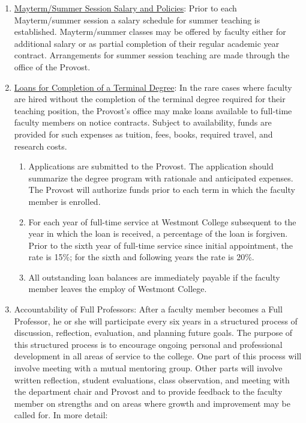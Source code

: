 \begin{enumerate}[label=\alph*)]
				\item{\underline{ Mayterm/Summer Session Salary and Policies}:  Prior to each Mayterm/summer
					session a salary schedule for summer teaching is established.  Mayterm/summer
					classes may be offered by faculty either for additional salary or as partial
					completion of their regular academic year contract. Arrangements for summer
					session teaching are made through the office of the Provost. }

				\item{\underline{ Loans for Completion of a Terminal Degree}:  In the rare
					cases where faculty are hired without the completion of the terminal degree
					required for their teaching position, the Provost's office may make loans
					available to full-time faculty members on notice contracts. Subject to
					availability, funds are provided for such expenses as tuition, fees, books,
					required travel, and research costs.

					\begin{enumerate}[label=\arabic*)]

						\item{ Applications are submitted to the Provost.  The
							application should summarize the degree program with
							rationale and anticipated expenses.  The Provost will
							authorize funds prior to each term in which the faculty
							member is enrolled. }

						\item{ For each year of full-time service at Westmont
							College subsequent to the year in which the loan is
							received, a percentage of the loan is forgiven.  Prior to
							the sixth year of full-time service since initial
							appointment, the rate is 15\%; for the sixth and following
							years the rate is 20\%. }

						\item{ All outstanding loan balances are immediately payable
							if the faculty member leaves the employ of Westmont College.}

					\end{enumerate}
				}

				\item{Accountability of Full Professors:  After a faculty member becomes a
					Full Professor, he or she will participate every six years in a structured
					process of discussion, reflection, evaluation, and planning future goals. The
					purpose of this structured process is to encourage ongoing personal and
					professional development in all areas of service to the college. One part of
					this process will involve meeting with a mutual mentoring group. Other parts
					will involve written reflection, student evaluations, class observation, and
					meeting with the department chair and Provost and to provide feedback to the
					faculty member on strengths and on areas where growth and improvement may be
					called for. In more detail:

}
\end{enumerate}
